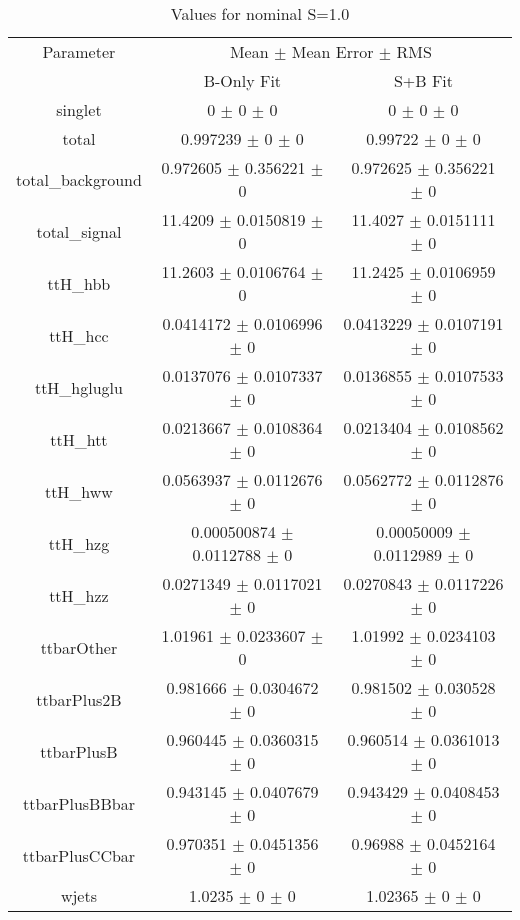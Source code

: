 \begin{table}
\centering
\caption{Values for nominal S=1.0}
\begin{tabular}{ccc}
\toprule
Parameter & \multicolumn{2}{c}{Mean $\pm$ Mean Error $\pm$ RMS}\\
 & B-Only Fit & S+B Fit\\
\midrule
singlet & \num{0} $\pm$ \num{0} $\pm$ \num{0} & \num{0} $\pm$ \num{0} $\pm$ \num{0}\\
total & \num{0.997239} $\pm$ \num{0} $\pm$ \num{0} & \num{0.99722} $\pm$ \num{0} $\pm$ \num{0}\\
total\_background & \num{0.972605} $\pm$ \num{0.356221} $\pm$ \num{0} & \num{0.972625} $\pm$ \num{0.356221} $\pm$ \num{0}\\
total\_signal & \num{11.4209} $\pm$ \num{0.0150819} $\pm$ \num{0} & \num{11.4027} $\pm$ \num{0.0151111} $\pm$ \num{0}\\
ttH\_hbb & \num{11.2603} $\pm$ \num{0.0106764} $\pm$ \num{0} & \num{11.2425} $\pm$ \num{0.0106959} $\pm$ \num{0}\\
ttH\_hcc & \num{0.0414172} $\pm$ \num{0.0106996} $\pm$ \num{0} & \num{0.0413229} $\pm$ \num{0.0107191} $\pm$ \num{0}\\
ttH\_hgluglu & \num{0.0137076} $\pm$ \num{0.0107337} $\pm$ \num{0} & \num{0.0136855} $\pm$ \num{0.0107533} $\pm$ \num{0}\\
ttH\_htt & \num{0.0213667} $\pm$ \num{0.0108364} $\pm$ \num{0} & \num{0.0213404} $\pm$ \num{0.0108562} $\pm$ \num{0}\\
ttH\_hww & \num{0.0563937} $\pm$ \num{0.0112676} $\pm$ \num{0} & \num{0.0562772} $\pm$ \num{0.0112876} $\pm$ \num{0}\\
ttH\_hzg & \num{0.000500874} $\pm$ \num{0.0112788} $\pm$ \num{0} & \num{0.00050009} $\pm$ \num{0.0112989} $\pm$ \num{0}\\
ttH\_hzz & \num{0.0271349} $\pm$ \num{0.0117021} $\pm$ \num{0} & \num{0.0270843} $\pm$ \num{0.0117226} $\pm$ \num{0}\\
ttbarOther & \num{1.01961} $\pm$ \num{0.0233607} $\pm$ \num{0} & \num{1.01992} $\pm$ \num{0.0234103} $\pm$ \num{0}\\
ttbarPlus2B & \num{0.981666} $\pm$ \num{0.0304672} $\pm$ \num{0} & \num{0.981502} $\pm$ \num{0.030528} $\pm$ \num{0}\\
ttbarPlusB & \num{0.960445} $\pm$ \num{0.0360315} $\pm$ \num{0} & \num{0.960514} $\pm$ \num{0.0361013} $\pm$ \num{0}\\
ttbarPlusBBbar & \num{0.943145} $\pm$ \num{0.0407679} $\pm$ \num{0} & \num{0.943429} $\pm$ \num{0.0408453} $\pm$ \num{0}\\
ttbarPlusCCbar & \num{0.970351} $\pm$ \num{0.0451356} $\pm$ \num{0} & \num{0.96988} $\pm$ \num{0.0452164} $\pm$ \num{0}\\
wjets & \num{1.0235} $\pm$ \num{0} $\pm$ \num{0} & \num{1.02365} $\pm$ \num{0} $\pm$ \num{0}\\
\bottomrule
\end{tabular}
\end{table}